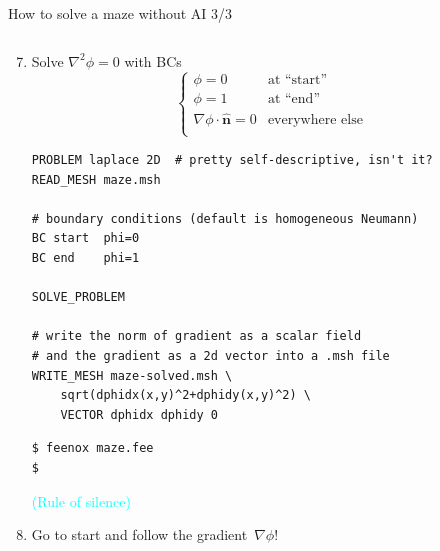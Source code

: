 \documentclass[
  ignorenonframetext,
  aspectratio=169,
]{beamer}
\begin{document}
\begin{frame}[fragile]{How to solve a maze without AI 3/3}
\protect\hypertarget{how-to-solve-a-maze-without-ai-33}{}
\begin{columns}[T]
\begin{column}{0.5\textwidth}
\begin{enumerate}
\setcounter{enumi}{6}
\item
  Solve \(\nabla^2 \phi = 0\) with BCs \vspace{-0.5cm} \[
  \begin{cases}
  \phi=0 & \text{at “start”} \\
  \phi=1 & \text{at “end”} \\
  \nabla \phi \cdot \hat{\mathbf{n}} = 0 & \text{everywhere else} \\
  \end{cases}
  \]

  \vspace{-0.5cm}

\begin{lstlisting}[style=feenox]
PROBLEM laplace 2D  # pretty self-descriptive, isn't it?
READ_MESH maze.msh

# boundary conditions (default is homogeneous Neumann)
BC start  phi=0 
BC end    phi=1

SOLVE_PROBLEM

# write the norm of gradient as a scalar field
# and the gradient as a 2d vector into a .msh file
WRITE_MESH maze-solved.msh \
    sqrt(dphidx(x,y)^2+dphidy(x,y)^2) \
    VECTOR dphidx dphidy 0 
\end{lstlisting}

\begin{lstlisting}[style=terminal]
$ feenox maze.fee
$
\end{lstlisting}

  \vspace{-0.25cm}\hfill{\footnotesize\textcolor{cyan}{(Rule of {silence})}}
\item
  Go to start and follow the gradient~\(\nabla \phi\)!
\end{enumerate}
\end{column}


\end{columns}
\end{frame}
\end{document}
